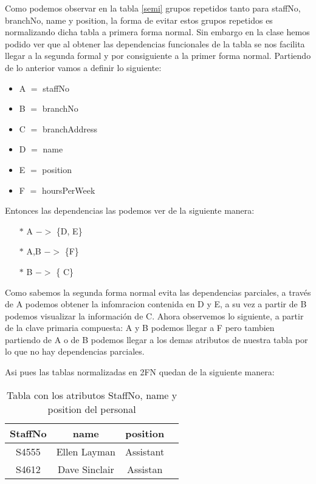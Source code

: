 \documentclass[spanish]{article}
\begin{document}
	
	Como podemos observar en la tabla \ref{semi} grupos repetidos tanto para staffNo, branchNo, name y position, la forma de evitar estos grupos repetidos es normalizando dicha tabla a primera forma normal.
	Sin embargo en la clase hemos podido ver que al obtener las dependencias funcionales de la tabla se nos facilita llegar a la segunda formal y por consiguiente a la primer forma normal.
	Partiendo de lo anterior vamos a definir lo siguiente:
	\begin{itemize}
	    \item A $=$ staffNo
	    \item B $=$ branchNo
	    \item C $=$ branchAddress
	    \item D $=$ name
	    \item E $=$ position
	    \item F $=$ hoursPerWeek
	\end{itemize}
	Entonces las dependencias las podemos ver de la siguiente manera:\\
	\begin{itemize}
	    \item [$*$] A $->$ \{D, E\}
	    \item [$*$] A,B $->$ \{F\}
	    \item [$*$] B $->$ \{ C\}
	\end{itemize}
	
	Como sabemos la segunda forma normal evita las dependencias parciales, a través de A podemos obtener la infomracion contenida en D y E, a su vez a partir de B podemos visualizar la información de C. Ahora observemos lo siguiente, a partir de la clave primaria compuesta: A y B podemos llegar a F pero tambien partiendo de A o de B podemos llegar a los demas atributos de nuestra tabla por lo que no hay dependencias parciales.
	
	Asi pues las tablas normalizadas en 2FN quedan de la siguiente manera:\\
	
	\begin{table}[ht]
	    \centering
	    \begin{tabular}{|c|c|c|l|}
	    \hline
	    \rowcolor{LightBlue2}
	    \textbf{StaffNo} & \textbf{name} & \textbf{position}\\ \hline
	        S4555 &  Ellen Layman & Assistant\\ \hline
	        S4612 &  Dave Sinclair & Assistan\\ \hline
	    \end{tabular} 
	    \caption{Tabla con los atributos StaffNo, name y position del personal}
	    \label{tab:Personal}
	\end{table}
	
\end{document}

